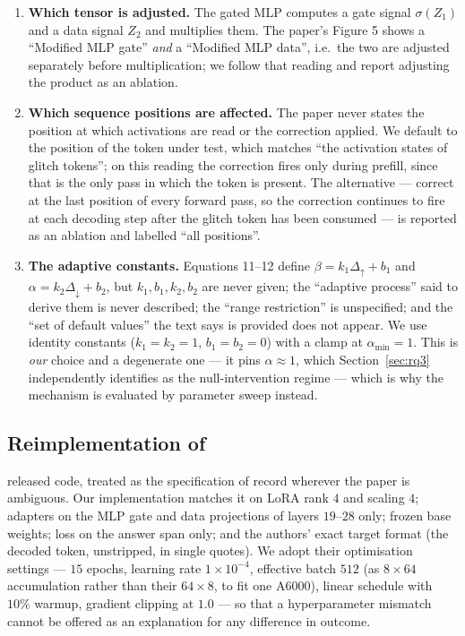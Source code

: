 \begin{enumerate}[leftmargin=*]
\item \textbf{Which tensor is adjusted.} The gated MLP computes a gate signal
$\sigma(Z_1)$ and a data signal $Z_2$ and multiplies them. The paper's Figure 5
shows a ``Modified MLP gate'' \emph{and} a ``Modified MLP data'', i.e.\ the two
are adjusted separately before multiplication; we follow that reading and report
adjusting the product as an ablation.
\item \textbf{Which sequence positions are affected.} The paper never states the
position at which activations are read or the correction applied. We default to
the position of the token under test, which matches ``the activation states of
glitch tokens''; on this reading the correction fires only during prefill, since
that is the only pass in which the token is present. The alternative --- correct
at the last position of every forward pass, so the correction continues to fire
at each decoding step after the glitch token has been consumed --- is reported as
an ablation and labelled ``all positions''.
\item \textbf{The adaptive constants.} Equations 11--12 define
$\beta = k_1\Delta_\uparrow + b_1$ and $\alpha = k_2\Delta_\downarrow + b_2$, but
$k_1, b_1, k_2, b_2$ are never given; the ``adaptive process'' said to derive
them is never described; the ``range restriction'' is unspecified; and the ``set
of default values'' the text says is provided does not appear. We use identity
constants ($k_1 = k_2 = 1$, $b_1 = b_2 = 0$) with a clamp at $\alpha_{\min} = 1$.
This is \emph{our} choice and a degenerate one --- it pins $\alpha \approx 1$,
which Section~\ref{sec:rq3} independently identifies as the null-intervention
regime --- which is why the mechanism is evaluated by parameter sweep instead.
\end{enumerate}

\subsection{Reimplementation of \gc{}}

\gc{} released code, treated as the specification of record wherever the paper is
ambiguous. Our implementation matches it on LoRA rank $4$ and scaling $4$;
adapters on the MLP gate and data projections of layers $19$--$28$ only; frozen
base weights; loss on the answer span only; and the authors' exact target format
(the decoded token, unstripped, in single quotes). We adopt their optimisation
settings --- $15$ epochs, learning rate $1\times 10^{-4}$, effective batch $512$
(as $8 \times 64$ accumulation rather than their $64 \times 8$, to fit one
A6000), linear schedule with $10\%$ warmup, gradient clipping at $1.0$ --- so
that a hyperparameter mismatch cannot be offered as an explanation for any
difference in outcome.

